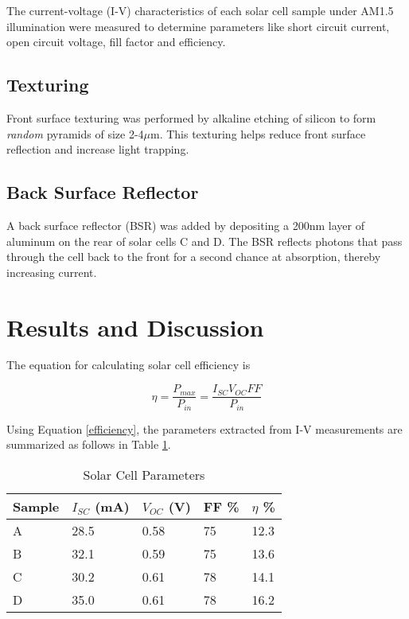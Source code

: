 \documentclass[]{report}
\begin{document}
The current-voltage (I-V) characteristics of each solar cell sample under AM1.5 illumination were measured to determine parameters like short circuit current, open circuit voltage, fill factor and efficiency.

\subsection{Texturing}
Front surface texturing was performed by alkaline etching of silicon to form \emph{random} pyramids of size 2-4$\mu$m. This texturing helps reduce front surface reflection and increase light trapping.

\subsection{Back Surface Reflector}
A back surface reflector (BSR) was added by depositing a 200nm layer of aluminum on the rear of solar cells C and D. The BSR reflects photons that pass through the cell back to the front for a second chance at absorption, thereby increasing current.

\section{Results and Discussion}
The equation for calculating solar cell efficiency is 

\begin{equation}
    \label{efficiency}
    \eta = \frac{P_{max}}{P_{in}} = \frac{I_{SC}V_{OC}FF}{P_{in}}
\end{equation}

Using Equation \ref{efficiency}, the parameters extracted from I-V measurements are summarized as follows in Table \ref{parameters}. 

\begin{table}[h]
    \caption{Solar Cell Parameters}
    \label{parameters}
    \centering
    \begin{tabularx}{\linewidth}{lXXXX}
        \toprule
        Sample & $I_{SC}$ (mA) & $V_{OC}$ (V) & FF \% & $\eta$ \% \\
        \midrule
        A & 28.5 & 0.58 & 75 & 12.3 \\
        B & 32.1 & 0.59 & 75 & 13.6 \\
        C & 30.2 & 0.61 & 78 & 14.1 \\
        D & 35.0 & 0.61 & 78 & 16.2 \\
        \bottomrule
    \end{tabularx}
\end{table}
\end{document}
